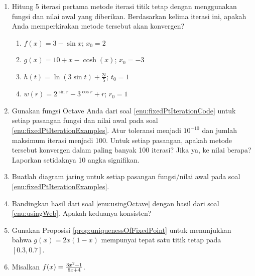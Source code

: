 \begin{enumerate}
\begin{enumerate}
\item $g(x)=7x^{2}+5x-9$
\item $g(x)=x+\cos x$
\item \label{exc:fixedpt-7}$g(x)=6x^{5}+12x^{2}-8$ \hasananswer 
\item \label{exc:fixedpt-8}$g(x)=x^{2}-e^{3x+4}$ \hasasolution 
\item $g(x)=7x-3\cos(\pi x-2)+\ln|2x^{2}+4x-8|$
\item \label{exc:fixedpt-9}$g(x)=3^{x^{2}-5x+1}-2^{-x^{2}-5x-1}$ \hasananswer 
\end{enumerate}
\item \label{enu:fixedPtIterationExamples}Hitung 5 iterasi pertama metode
iterasi titik tetap dengan menggunakan fungsi dan nilai awal yang
diberikan. Berdasarkan kelima iterasi ini, apakah Anda memperkirakan
metode tersebut akan konvergen?

\begin{enumerate}
\item $f(x)=3-\sin x$; $x_{0}=2$
\item \label{exc:fixedpt-10}$g(x)=10+x-\cosh(x)$; $x_{0}=-3$ \hasasolution 
\item \label{exc:fixedpt-11}$h(t)=\ln(3\sin t)+\frac{2t}{5}$; $t_{0}=1$ \hasananswer 
\item $w(r)=2^{\sin r}-3^{\cos r}+r$; $r_{0}=1$
\end{enumerate}
\item \label{enu:usingOctave}Gunakan fungsi Octave Anda dari soal \ref{enu:fixedPtIterationCode}
untuk setiap pasangan fungsi dan nilai awal pada soal \ref{enu:fixedPtIterationExamples}.
Atur toleransi menjadi $10^{-10}$ dan jumlah maksimum iterasi menjadi
100. Untuk setiap pasangan, apakah metode tersebut konvergen dalam
paling banyak 100 iterasi? Jika ya, ke nilai berapa? Laporkan setidaknya
10 angka signifikan. \haspartwithsolution  \haspartwithanswer 
\item \label{enu:usingWeb}Buatlah diagram jaring untuk setiap pasangan
fungsi/nilai awal pada soal \ref{enu:fixedPtIterationExamples}. \haspartwithsolution  \haspartwithanswer 
\item Bandingkan hasil dari soal \ref{enu:usingOctave} dengan hasil dari
soal \ref{enu:usingWeb}. Apakah keduanya konsisten?
\item Gunakan Proposisi \ref{prop:uniquenessOfFixedPoint} untuk menunjukkan
bahwa $g(x)=2x(1-x)$ mempunyai tepat satu titik tetap pada $[0.3,0.7]$.
\item \label{exc:fixedpt-12}Misalkan $f(x)=\frac{3x^{2}\text{\textminus}1}{6x+4}$. \hasasolution 


\end{enumerate}
